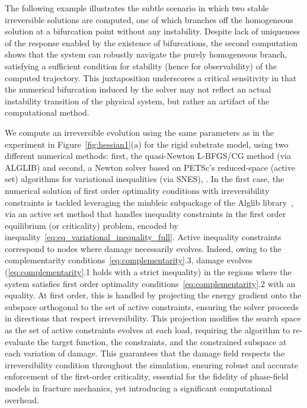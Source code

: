 \documentclass[10pt]{article}
\begin{document}
The following example illustrates the subtle scenario in which two stable irreversible solutions are computed, one of which branches off the homogeneous solution at a bifurcation point without any instability.
Despite lack of uniqueness of the response enabled by the existence of bifurcations, the second computation shows that the system can robustly navigate the purely homogeneous branch, satisfying a sufficient condition for stability (hence for observability) of the computed trajectory.
This juxtaposition underscores a critical sensitivity in that the numerical bifurcation induced by the solver may not reflect an actual instability transition of the physical system, but rather an artifact of the computational method.

    {
        We compute an irreversible evolution using the same parameters as in the experiment in Figure~\ref{fig:hessian1}(a) for the rigid substrate model,
        using two different numerical methods: first, the quasi-Newton L-BFGS/CG method (via ALGLIB) and second, a Newton solver based on PETSc's reduced-space (active set) algorithms for variational inequalities (via SNES), \cite{petsc-user-ref, petsc-efficient}.
        In the first case, the numerical solution of first order optimality conditions with irreversibility constraints is tackled leveraging the minbleic subpackage of the Alglib library~\cite{Bochkanov2013-lk}, via an active set method that handles inequality constraints in the first order equilibrium (or criticality) problem, encoded by inequality~\eqref{eq:eq_variational_inequality_full}.
        Active inequality constraints correspond to nodes where damage necessarily evolves. Indeed, owing to the complementarity conditions~\eqref{eq:complementarity}.3, damage evolves (\eqref{eq:complementarity}.1 holds with a strict inequality) in the regions where the system satisfies first order optimality conditions~\eqref{eq:complementarity}.2 with an equality.
        At first order, this is handled by projecting the energy gradient onto the subspace orthogonal to the set of active constraints, ensuring the solver proceeds in directions that respect irreversibility.
        This projection modifies the search space as the set of active constraints evolves at each load, requiring the algorithm to re-evaluate the target function, the constraints, and the constrained subspace at each variation of damage.
        This guarantees that the damage field respects the irreversibility condition throughout the simulation, ensuring robust and accurate enforcement of the first-order criticality, essential for the fidelity of phase-field models in fracture mechanics, yet introducing a significant computational overhead.
}
\end{document}
